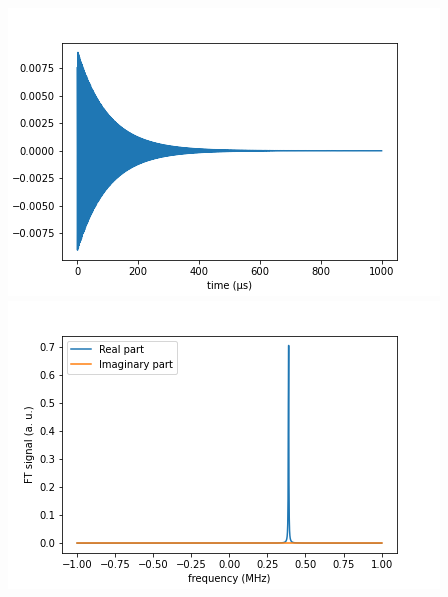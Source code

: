 \documentclass[10pt]{beamer}
\begin{document}
\begin{frame}
\begin{columns}[T]
\begin{column}{.5\textwidth}
\begin{column}{.5\textwidth}
\end{column}
\end{column}
\begin{column}{.5\textwidth}
\includegraphics[width=\textwidth]{./spin1-2/22uncorrelated_pure_dipD2/FIDSignal.png}
\includegraphics[width=\textwidth]{./spin1-2/22uncorrelated_pure_dipD2/FTSignal.png}
\end{column}
\end{columns}
\end{frame}
\end{document}

